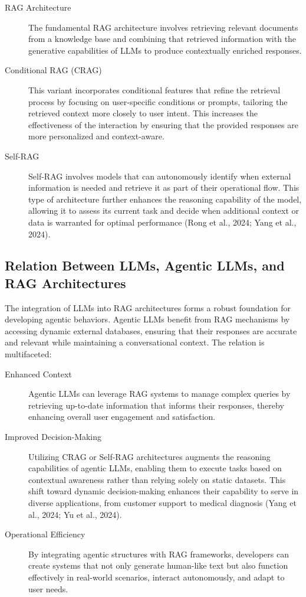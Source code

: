 \begin{description}
    \item[RAG Architecture] The fundamental RAG architecture involves retrieving relevant documents from a knowledge base and combining that retrieved information with the generative capabilities of LLMs to produce contextually enriched responses.

    \item[Conditional RAG (CRAG)] This variant incorporates conditional features that refine the retrieval process by focusing on user-specific conditions or prompts, tailoring the retrieved context more closely to user intent. This increases the effectiveness of the interaction by ensuring that the provided responses are more personalized and context-aware.

    \item[Self-RAG] Self-RAG involves models that can autonomously identify when external information is needed and retrieve it as part of their operational flow. This type of architecture further enhances the reasoning capability of the model, allowing it to assess its current task and decide when additional context or data is warranted for optimal performance (Rong et al., 2024; Yang et al., 2024).

\end{description}

\subsection{Relation Between LLMs, Agentic LLMs, and RAG Architectures}
\label{subsec:background:second_section:fourth_subsection}

The integration of LLMs into RAG architectures forms a robust foundation for developing agentic behaviors. Agentic LLMs benefit from RAG mechanisms by accessing dynamic external databases, ensuring that their responses are accurate and relevant while maintaining a conversational context. The relation is multifaceted:

\begin{description}
    \item[Enhanced Context] Agentic LLMs can leverage RAG systems to manage complex queries by retrieving up-to-date information that informs their responses, thereby enhancing overall user engagement and satisfaction.
    
    \item[Improved Decision-Making] Utilizing CRAG or Self-RAG architectures augments the reasoning capabilities of agentic LLMs, enabling them to execute tasks based on contextual awareness rather than relying solely on static datasets. This shift toward dynamic decision-making enhances their capability to serve in diverse applications, from customer support to medical diagnosis (Yang et al., 2024; Yu et al., 2024).
    
    \item[Operational Efficiency] By integrating agentic structures with RAG frameworks, developers can create systems that not only generate human-like text but also function effectively in real-world scenarios, interact autonomously, and adapt to user needs.
\end{description}
 

